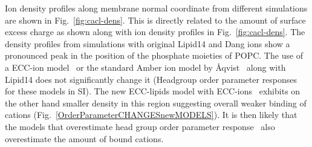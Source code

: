 \documentclass[aip,jcp,twocolumn]{revtex4}
\begin{document}
Ion density profiles along membrane normal coordinate
from different simulations are shown in Fig.~\ref{fig:cacl-dens}.
This is directly related to the amount of surface excess charge 
as shown along with ion density profiles in  Fig.~\ref{fig:cacl-dens}.
The density profiles from simulations with original Lipid14 \cite{dickson14}
and Dang ions \cite{smith94,chang1999,dang2006} 
show a pronounced peak in the position of the phosphate moieties of POPC. 
The use of a ECC-ion model~\cite{Jungwirth2017,Jungwirth2015,kohagen14,kohagen16}
or the standard Amber ion model by \AA{qvist}~\cite{aqvist90}
along with Lipid14 does not significantly change it 
(Headgroup order parameter responses for these models in SI).
The new ECC-lipids model with ECC-ions~\cite{Jungwirth2017,Jungwirth2015,kohagen14,kohagen16}
exhibits on the other hand smaller density in this region 
suggesting overall weaker binding of cations (Fig.~\ref{OrderParameterCHANGESnewMODELS}). 
It is then likely that the models that overestimate head group order parameter response~\cite{catte16}
also overestimate the amount of bound cations.
\end{document}
